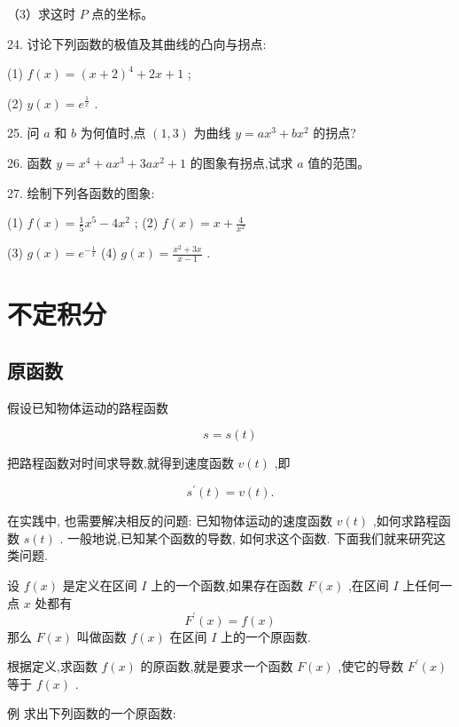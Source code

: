 \documentclass[lang=cn,newtx,12pt,scheme=chinese]{elegantbook}
\begin{document}
（3）求这时 \(P\) 点的坐标。

24. 讨论下列函数的极值及其曲线的凸向与拐点:

(1) \(f\left( x\right) = {\left( x + 2\right) }^{4} + {2x} + 1\) ;

(2) \(y\left( x\right) = {e}^{\frac{1}{x}}\) .

25. 问 \(a\) 和 \(b\) 为何值时,点 \(\left( {1,3}\right)\) 为曲线 \(y = a{x}^{3} + b{x}^{2}\) 的拐点?

26. 函数 \(y = {x}^{4} + a{x}^{3} + {3a}{x}^{2} + 1\) 的图象有拐点,试求 \(a\) 值的范围。

27. 绘制下列各函数的图象:

(1) \(f\left( x\right) = \frac{1}{5}{x}^{5} - 4{x}^{2}\) ; (2) \(f\left( x\right) = x + \frac{4}{{x}^{2}}\)

(3) \(g\left( x\right) = {e}^{-\frac{1}{x}}\) (4) \(g\left( x\right) = \frac{{x}^{2} + {3x}}{x - 1}\) .

\chapter{不定积分}

\section{原函数}

假设已知物体运动的路程函数

\[
s = s\left( t\right)
\]

把路程函数对时间求导数,就得到速度函数 \(v\left( t\right)\) ,即

\[
{s}^{\prime }\left( t\right) = v\left( t\right) \text{.}
\]

在实践中, 也需要解决相反的问题: 已知物体运动的速度函数 \(v\left( t\right)\) ,如何求路程函数 \(s\left( t\right)\) . 一般地说,已知某个函数的导数, 如何求这个函数. 下面我们就来研究这类问题.
\begin{definition}[原函数]
设 \(f\left( x\right)\) 是定义在区间 \(I\) 上的一个函数,如果存在函数 \(F\left( x\right)\) ,在区间 \(I\) 上任何一点 \(x\) 处都有
\[
{F}^{\prime }\left( x\right) = f\left( x\right)
\]
那么 \(F\left( x\right)\) 叫做函数 \(f\left( x\right)\) 在区间 \(I\) 上的一个原函数.
\end{definition}

根据定义,求函数 \(f\left( x\right)\) 的原函数,就是要求一个函数 \(F\left( x\right)\) ,使它的导数 \({F}^{\prime }\left( x\right)\) 等于 \(f\left( x\right)\) .

例 求出下列函数的一个原函数:
\end{document}
